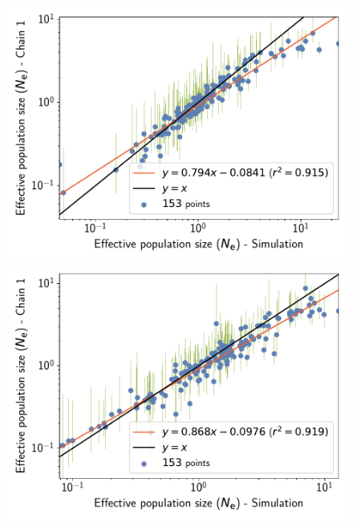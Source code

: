 \documentclass{article}
\providecommand{\DIFaddbeginFL}{} %
\providecommand{\DIFaddendFL}{} %
\providecommand{\DIFdelbeginFL}{} %
\providecommand{\DIFdelendFL}{} %
\begin{document}
\begin{figure}[t]
        \DIFdelbeginFL %
\DIFdelendFL \DIFaddbeginFL {}\DIFaddendFL \hfill
        \begin{minipage}{0.32\linewidth}
            \includegraphics[width=\linewidth, page=1]{simulations/BranchWise_SimuDiv_SiteMutSelBranchNe_BranchCorrelation_LogPopulationSize}
        \end{minipage}
        \DIFdelbeginFL %
\DIFdelendFL \DIFaddbeginFL {}\DIFaddendFL \hfill
        \begin{minipage}{0.32\linewidth}
            \includegraphics[width=\linewidth, page=1]{simulations/SimuPoly_SiteMutSelBranchNe_BranchCorrelation_LogPopulationSize}

\end{minipage}
\end{figure}
\end{document}
